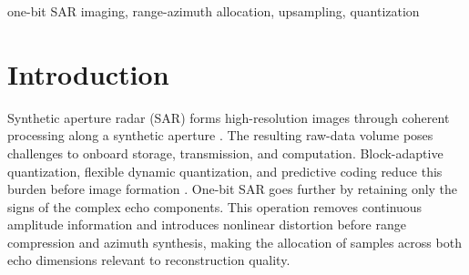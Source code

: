 \documentclass[conference]{IEEEtran}
\begin{document}
\begin{abstract}
One-bit acquisition reduces the raw-data burden of high-resolution synthetic aperture radar (SAR), but how a fixed pre-quantization upsampling budget should be allocated between range and azimuth remains unclear. We propose bidirectional range-azimuth upsampling (BRAU), which distributes this budget across both echo dimensions rather than concentrating it on one axis. Under a common separable random threshold and five integer budgets, bidirectional allocations consistently outperform unidirectional ones and form a near-optimal plateau. Range-compressed spectra further show reduced off-support and directional leakage, supporting the role of two-dimensional spectral redundancy.
\end{abstract}

\begin{IEEEkeywords}
one-bit SAR imaging, range-azimuth allocation, upsampling, quantization
\end{IEEEkeywords}

\section{Introduction}

Synthetic aperture radar (SAR) forms high-resolution images through coherent processing along a synthetic aperture \cite{cumming2005sar,curlander1991sar}. The resulting raw-data volume poses challenges to onboard storage, transmission, and computation. Block-adaptive quantization, flexible dynamic quantization, and predictive coding reduce this burden before image formation \cite{kwok1989baq,attema2010fdbaq,magli2003lossy}. One-bit SAR goes further by retaining only the signs of the complex echo components. This operation removes continuous amplitude information and introduces nonlinear distortion before range compression and azimuth synthesis, making the allocation of samples across both echo dimensions relevant to reconstruction quality.
\end{document}
